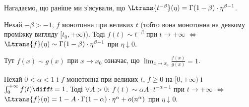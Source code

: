 Нагадаємо, що раніше ми з'ясували, що
$\Ltrans{t^{-\beta}}(\eta) = \Gamma(1 - \beta) \cdot \eta^{\beta - 1}$.

\begin{theorem}[Таубера]
    Нехай $-\beta > - 1$, $f$ монотонна при великих $t$ (тобто вона монотонна на деякому проміжку вигляду $[t_0, +\infty)$). Тоді $f(t) \sim t^{-\beta}$ при $t \to +\infty$ $\iff$ $\Ltrans{f}(\eta) \sim \Gamma(1 - \beta) \cdot \eta^{\beta - 1}$ при $\eta \downarrow 0$.
\end{theorem}

\begin{remark}
    Тут $f(x) \sim g(x)$ при $x \to x_0$ означає, що $\lim_{x \to x_0} \frac{f(x)}{g(x)} = 1$.
\end{remark}

\begin{corollary}
    Нехай $0 < \alpha < 1$ і $f$ монотонна при великих $t$, $f \ge 0$ на $[0, +\infty)$ і $\int_0^{+\infty} f(t) \diff t = 1$. Тоді $\forall A > 0$: $f(t) \sim \alpha A \cdot t^{-\alpha - 1}$ при $t \to +\infty$ $\iff$ $\Ltrans{f}(\eta) = 1 - A \cdot \Gamma(1 - \alpha) \cdot \eta^\alpha + o(n^\alpha)$ при $\eta \downarrow 0$.
\end{corollary}


